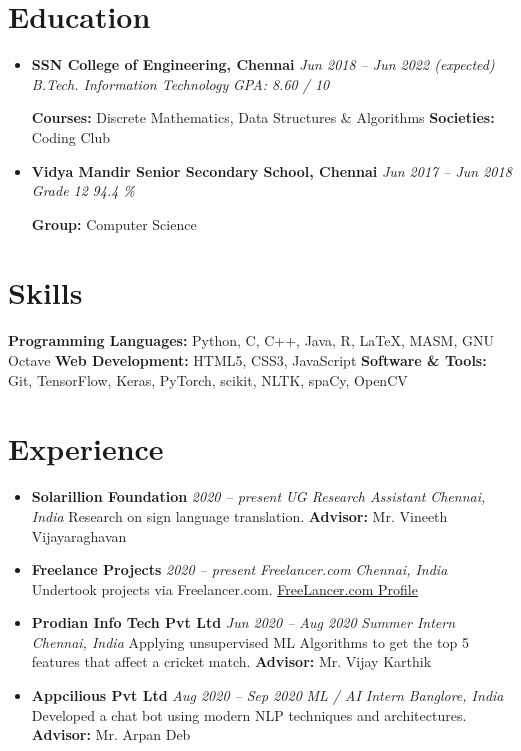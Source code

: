 \documentclass[letterpaper,10pt]{article}
\newcommand{\name}{M Badri Narayanan}
\newenvironment{cvitemize}{
    \begin{itemize}[leftmargin=10pt,label={},afterlabel={},after=\vspace{-12pt}]
}{
    \end{itemize}
}
\newcommand{\eduitem}[5]{
    \item{
        \textbf{#1} \hfill \textit{#2} \newline
        \textit{#3} \hfill \textit{#4} \newline
        #5
    }
}
\newcommand{\point}{\raisebox{0.1\height}{$\rightarrow$}\hspace{4pt}}
\newcommand{\expitem}[6]{
    \item{
        \textbf{#1} \hfill \textit{#2} \newline
        \textit{#3} \hfill \textit{#4} \newline
        \point #5 \newline
        #6
    }
}
\newcommand{\me}{\uline{\name}}
\newcommand{\pubitem}[5]{
    \item{
        \textit{#1} \hfill #5 \newline
        #2 \newline
        \textit{#3}
        \ifthenelse{\isempty{#4}}
            {}
            {\newline #4}
    }
}
\begin{document}
\section*{Education}
\begin{cvitemize}
    \eduitem{SSN College of Engineering, Chennai}{Jun 2018 -- Jun 2022 (expected)}{B.Tech. Information Technology}{GPA: 8.60 / 10 }{
        \textbf{Courses:} Discrete Mathematics, Data Structures \& Algorithms\newline
        \textbf{Societies:} Coding Club
    }
    \eduitem{Vidya Mandir Senior Secondary School, Chennai}{Jun 2017 -- Jun 2018}{Grade 12}{94.4 \%}{
        \textbf{Group:} Computer Science \newline
    }
\end{cvitemize}
\section*{Skills}
\textbf{Programming Languages:} Python, C, C++, Java, R, \LaTeX, MASM, GNU Octave\newline
\textbf{Web Development:} HTML5, CSS3, JavaScript \newline
\textbf{Software \& Tools:} Git, TensorFlow, Keras, PyTorch, scikit, NLTK, spaCy, OpenCV

\section*{Experience}
\begin{cvitemize}
    \expitem{Solarillion Foundation}{2020 -- present}{UG Research Assistant}{Chennai, India}{Research on sign language translation.}{\textbf{Advisor:} Mr. Vineeth Vijayaraghavan}
    \expitem{Freelance Projects}{2020 -- present}{Freelancer.com}{Chennai, India}{Undertook projects via Freelancer.com.}{\href{https://www.freelancer.in/u/HalceyonAI}{FreeLancer.com Profile}}
    \expitem{Prodian Info Tech Pvt Ltd}{Jun 2020 -- Aug 2020}{Summer Intern}{Chennai, India}{Applying unsupervised ML Algorithms to get the top 5 features that affect a cricket match.}{\textbf{Advisor:} Mr. Vijay Karthik}
    \expitem{Appcilious Pvt Ltd}{Aug 2020 -- Sep 2020}{ML / AI Intern}{Banglore, India}{Developed a chat bot using modern NLP techniques and architectures.}{\textbf{Advisor:} Mr. Arpan Deb}
\end{cvitemize}

\end{document}
